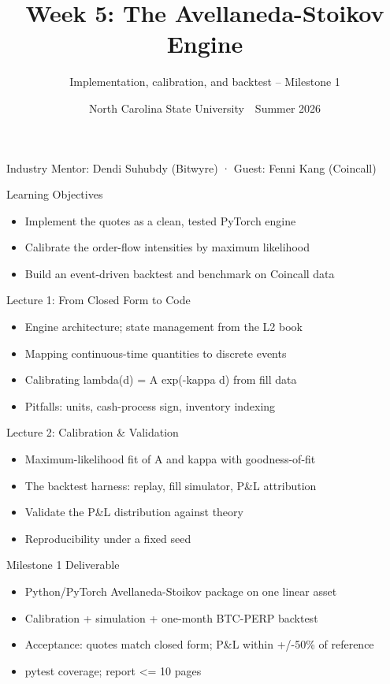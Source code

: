 \documentclass[aspectratio=169,11pt]{beamer}
\title{Week 5: The Avellaneda-Stoikov Engine}
\subtitle{Implementation, calibration, and backtest -- Milestone 1}
\date{North Carolina State University \,\textbar\, Summer 2026}
\begin{document}
\begin{frame}[plain]\titlepage
\begin{center}\tiny Industry Mentor: Dendi Suhubdy (Bitwyre)  ·  Guest: Fenni Kang (Coincall)\end{center}\end{frame}
\begin{frame}{Learning Objectives}
\begin{itemize}
  \item Implement the quotes as a clean, tested PyTorch engine
  \item Calibrate the order-flow intensities by maximum likelihood
  \item Build an event-driven backtest and benchmark on Coincall data
\end{itemize}\end{frame}
\begin{frame}{Lecture 1: From Closed Form to Code}
\begin{itemize}
  \item Engine architecture; state management from the L2 book
  \item Mapping continuous-time quantities to discrete events
  \item Calibrating lambda(d) = A exp(-kappa d) from fill data
  \item Pitfalls: units, cash-process sign, inventory indexing
\end{itemize}\end{frame}
\begin{frame}{Lecture 2: Calibration \& Validation}
\begin{itemize}
  \item Maximum-likelihood fit of A and kappa with goodness-of-fit
  \item The backtest harness: replay, fill simulator, P\&L attribution
  \item Validate the P\&L distribution against theory
  \item Reproducibility under a fixed seed
\end{itemize}\end{frame}
\begin{frame}{Milestone 1 Deliverable}
\begin{itemize}
  \item Python/PyTorch Avellaneda-Stoikov package on one linear asset
  \item Calibration + simulation + one-month BTC-PERP backtest
  \item Acceptance: quotes match closed form; P\&L within +/-50\% of reference
  \item pytest coverage; report \textless{}= 10 pages
\end{itemize}\end{frame}
\end{document}
